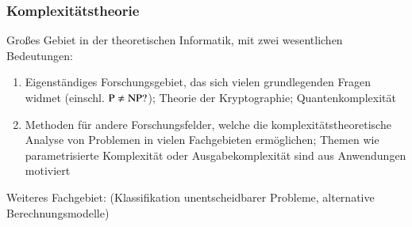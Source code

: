 \documentclass[aspectratio=1610,onlymath]{beamer}
\begin{document}
\begin{frame}\frametitle{Komplexitätstheorie}

Großes Gebiet in der theoretischen Informatik, mit zwei wesentlichen Bedeutungen:

\begin{enumerate}[1]
\item \alert{Eigenständiges Forschungsgebiet}, das sich vielen grundlegenden Fragen widmet (einschl. ${\textsc{P}}\neq{\textsc{NP}}?$); Theorie der Kryptographie; Quantenkomplexität
% 
\item \alert{Methoden für andere Forschungsfelder}, welche die komplexitätstheoretische Analyse von Problemen
in vielen Fachgebieten ermöglichen; Themen wie parametrisierte Komplexität oder Ausgabekomplexität sind aus
Anwendungen motiviert
\end{enumerate}

Weiteres Fachgebiet:  (Klassifikation unentscheidbarer Probleme, alternative Berechnungsmodelle)

\end{frame}

% 
%
\end{document}
